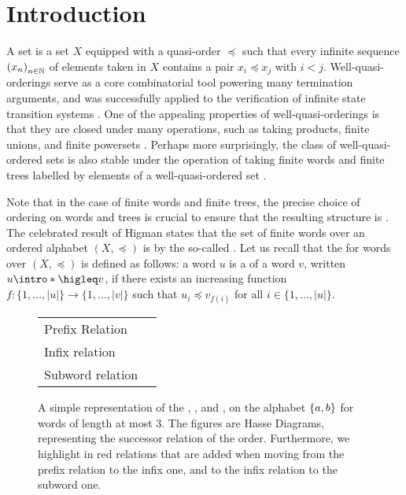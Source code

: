 \section{Introduction}
\label{introduction:sec}

A  set is a set $X$ equipped with a quasi-order
$\preceq$ such that every infinite sequence $\seqof{x_n}$ of elements taken in
$X$ contains a pair $x_i \preceq x_j$ with $i < j$. Well-quasi-orderings serve
as a core combinatorial tool powering many termination arguments, and was
successfully applied to the verification of infinite state transition systems
\cite{ABDU96,ABDU98}. One of the appealing properties of well-quasi-orderings
is that they are closed under many operations, such as taking products, finite
unions, and finite powersets \cite{SCSC12}. Perhaps more surprisingly, the
class of well-quasi-ordered sets is also stable under the operation of taking
finite words and finite trees labelled by elements of a well-quasi-ordered set
\cite{HIG52,KRU72}.

\AP
Note that in the case of finite words and finite trees, the precise choice of
ordering on words and trees is crucial to ensure that the resulting structure
is . The celebrated result of Higman states that the set
of finite words over an ordered alphabet $(X, \preceq)$ is
 by the so-called 
\cite{HIG52}. Let us recall that the  for words over $(X,
\preceq)$ is defined as follows: a word $u$ is a  of a word $v$,
written $u \intro*\higleq v$,
if there exists an increasing function $f \colon \{1, \ldots, |u|\} \to \{1,
\ldots, |v|\}$ such that $u_i \preceq v_{f(i)}$ for all $i \in \{1, \ldots,
|u|\}$.

\begin{figure}
    \centering
    \begin{tabular}{p{3cm}p{8cm}}
    Prefix Relation
    &
    
    \\
    Infix relation
    &
    
    \\
    Subword relation
    &
    
    \end{tabular}
    \caption{A simple representation of the ,
        ,
        and ,
        on the alphabet $\{ a,b \}$ for words of
        length at most $3$. The figures are Hasse Diagrams,
        representing the successor relation of the order.
        Furthermore, we highlight in red relations that are added
        when moving from the prefix relation to the infix one,
        and to the infix relation to the subword one.}
    \label{word-embeddings:fig}
\end{figure}

